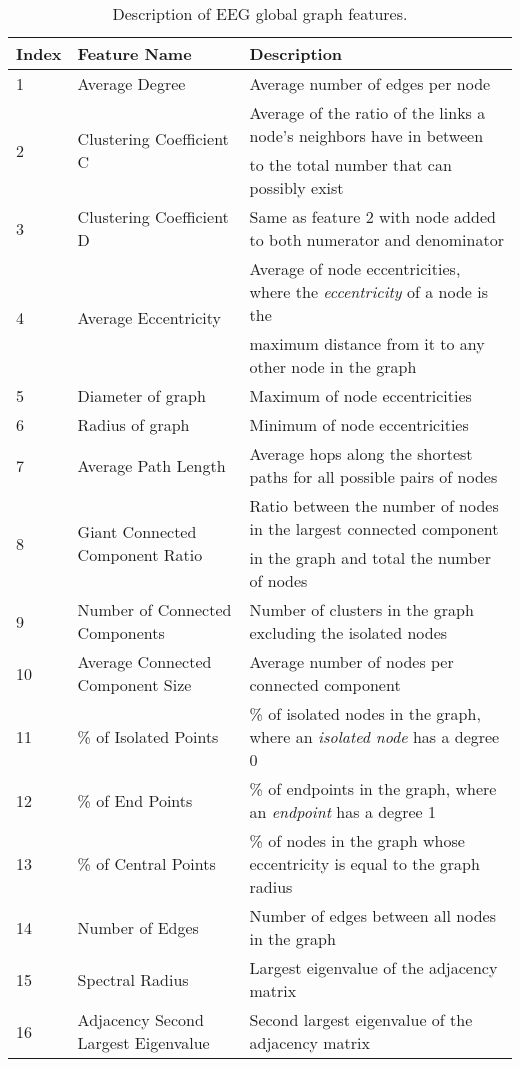 \documentclass{article} %
\theoremstyle{definition}
\theoremstyle{remark}
\begin{document}
\begin{table}[htb]
\caption{Description of EEG global graph features.}\label{tab:features}
\renewcommand{\arraystretch}{0.8} %
\begin{tabular}{lll}
Index&Feature Name& Description\\
\hline
\hline
1&Average Degree&Average number of edges per node\\
\multirow{2}{*}{2}&\multirow{2}{*}{Clustering Coefficient C} &Average of the ratio of the links a node's neighbors have in between\\
&&to the total number that can possibly exist\\
3&Clustering Coefficient D & Same as feature $2$ with node added to both numerator and denominator\\
\multirow{2}{*}{4}&\multirow{2}{*}{Average Eccentricity} & Average of node eccentricities, where the {\em eccentricity} of a node is the\\
&&maximum distance from it to any other node in the graph\\
5&Diameter of graph& Maximum of node eccentricities\\
6&Radius of graph& Minimum of node eccentricities\\
7&Average Path Length &Average hops along the shortest paths for all possible pairs of nodes\\
\multirow{2}{*}{8}&\multirow{2}{*}{Giant Connected Component Ratio}& Ratio between the number of nodes in the largest connected component\\ && in the graph and total
the number of nodes\\
9&Number of Connected Components&Number of clusters in the graph excluding the isolated nodes\\
10&Average Connected Component Size&Average number of nodes per connected component \\
11&\% of Isolated Points&\% of isolated nodes in the graph, where an {\em isolated node} has a degree 0\\
12&\% of End Points&\% of endpoints in the graph, where an {\em endpoint} has a degree 1\\
13&\% of Central Points&\% of nodes in the graph whose eccentricity is equal to the graph radius\\
14&Number of Edges&Number of edges between all nodes in the graph\\
15&Spectral Radius & Largest eigenvalue of the adjacency matrix\\
16&Adjacency Second Largest Eigenvalue&Second largest eigenvalue of the adjacency matrix\\

\end{tabular}
\end{table}
\end{document}
